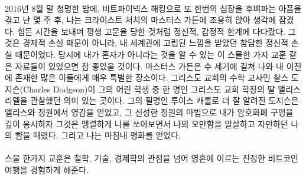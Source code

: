 \paragraph{}
2016년 8월 말 청명한 밤에, 비트파이넥스 해킹으로 또 한번의 심장을 후벼파는 아픔을 겪고 난 몇 주 후, 나는 크라이스트 처치의 마스터스 가든에 조용히 앉아 생각에 잠겼다. 
힘든 시간을 보내며 평생 고문을 당한 것처럼 정신적, 감정적 한계에 다다랐다. 그것은 경제적 손실 때문이 아니라, 내 세계관에 고립된 느낌을 받았던 참담한 정신적 손실 때문이었다. 
당시에 내가 혼자가 아니라는 것을 알 수 있는 이 스물한 가지 교훈 같은 자료들이 있었으면 참 좋았을 것이다. 
마스터스 가든은 수 세기에 걸쳐 나와 내 이전에 존재한 많은 이들에게 매우 특별한 장소이다.
그리스도 교회의 수학 교사인 찰스 도지슨(Charles Dodgson)이 그의 어린 학생 중 한 명인 그리스도 교회 학장의 딸 앨리스 리델을 관찰했던 의미 있는 곳이다.
그의 필명인 루이스 캐롤로 더 잘 알려진 도지슨은 앨리스와 정원에서 영감을 얻었고, 그 신성한 정원의 마법으로 내가 암호화폐 구멍을 깊이 응시하자
그것은 맹렬하게 나를 쏘아보면서 나의 오만함을 말살하고 자만하던 나의 뺨을 때렸다. 그리고 나는 마침내 평화를 얻었다. 

\paragraph{}
스물 한가지 교훈은 철학, 기술, 경제학의 관점을 넘어 영혼에 이르는 진정한 비트코인 여행을 경험하게 해준다.


